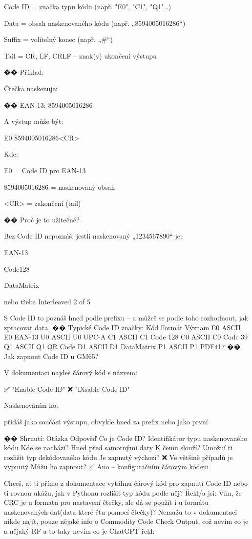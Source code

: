     Code ID = značka typu kódu (např. "E0", "C1", "Q1"…)

    Data = obsah naskenovaného kódu (např. „8594005016286“)

    Suffix = volitelný konec (např. „#“)

    Tail = CR, LF, CRLF – znak(y) ukončení výstupu

�� Příklad:

Čtečka naskenuje:

�� EAN-13: 8594005016286

A výstup může být:

E0 8594005016286<CR>

Kde:

    E0 = Code ID pro EAN-13

    8594005016286 = naskenovaný obsah

    <CR> = zakončení (tail)

�� Proč je to užitečné?

Bez Code ID nepoznáš, jestli naskenovaný „1234567890“ je:

    EAN-13

    Code128

    DataMatrix

    nebo třeba Interleaved 2 of 5

S Code ID to poznáš hned podle prefixu – a můžeš se podle toho rozhodnout, jak zpracovat data.
�� Typické Code ID značky:
Kód	Formát	Význam
E0	ASCII E0	EAN-13
U0	ASCII U0	UPC-A
C1	ASCII C1	Code 128
C0	ASCII C0	Code 39
Q1	ASCII Q1	QR Code
D1	ASCII D1	DataMatrix
P1	ASCII P1	PDF417
�� Jak zapnout Code ID u GM65?

V dokumentaci najdeš čárový kód s názvem:

    ✅ "Enable Code ID"
    ❌ "Disable Code ID"

Naskenováním ho:

    přidáš jako součást výstupu, obvykle hned za prefix nebo jako první

�� Shrnutí:
Otázka	Odpověď
Co je Code ID?	Identifikátor typu naskenovaného kódu
Kde se nachází?	Hned před samotnými daty
K čemu slouží?	Umožní ti rozlišit typ dekódovaného kódu
Je zapnutý výchozí?	❌ Ve většině případů je vypnutý
Můžu ho zapnout?	✅ Ano – konfiguračním čárovým kódem

Chceš, ať ti přímo z dokumentace vytáhnu čárový kód pro zapnutí Code ID nebo ti rovnou ukážu, jak v Pythonu rozlišit typ kódu podle něj?
Řekl/a jsi:
Vím, že CRC je u formatu pro nastavení čtečky, ale dá se použít i u formátu naskenovaných dat(data které čtu pomocí čtečky)? Nemužu to v dokumentaci nikde najít, pouze nějaké info o Commodity Code Check Output, což nevím co je a nějaký RF a to taky nevím co je
ChatGPT řekl:

